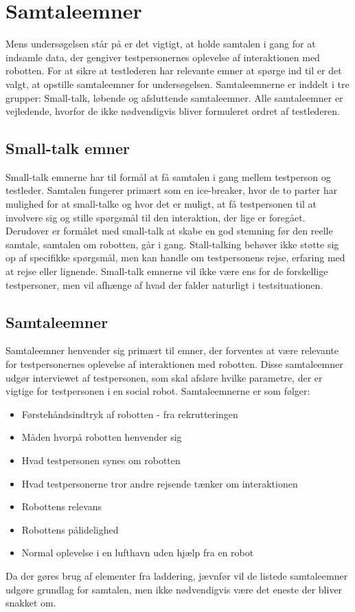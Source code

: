 \section{Samtaleemner}
\label{ParametreSamtaleemner}
%
Mens undersøgelsen står på er det vigtigt, at holde samtalen i gang for at indsamle data, der gengiver testpersonernes oplevelse af interaktionen med robotten. For at sikre at testlederen har relevante emner at spørge ind til er det valgt, at opstille samtaleemner for undersøgelsen. Samtaleemnerne er inddelt i tre grupper: Small-talk, løbende og afsluttende samtaleemner. Alle samtaleemner er vejledende, hvorfor de ikke nødvendigvis bliver formuleret ordret af testlederen.

\subsection{Small-talk emner} 
\label{ParametreISmallTalk}
%
Small-talk emnerne har til formål at få samtalen i gang mellem testperson og testleder. Samtalen fungerer primært som en ice-breaker, hvor de to parter har mulighed for at small-talke og hvor det er muligt, at få testpersonen til at involvere sig og stille spørgsmål til den interaktion, der lige er foregået. Derudover er formålet med small-talk at skabe en god stemning før den reelle samtale, samtalen om robotten, går i gang. Stall-talking behøver ikke støtte sig op af specifikke spørgsmål, men kan handle om testpersonens rejse, erfaring med at rejse eller lignende. Small-talk emnerne vil ikke være ens for de forskellige testpersoner, men vil afhænge af hvad der falder naturligt i testsituationen.  
%
\subsection{Samtaleemner} 
\label{ParametreSamtaleemner}
%
Samtaleemner henvender sig primært til emner, der forventes at være relevante for testpersonernes oplevelse af interaktionen med robotten. Disse samtaleemner udgør interviewet af testpersonen, som skal afsløre hvilke parametre, der er vigtige for testpersonen i en social robot. Samtaleemnerne er som følger:\blankline
%
\begin{itemize}
\item Førstehåndsindtryk af robotten - fra rekrutteringen
\item Måden hvorpå robotten henvender sig
\item Hvad testpersonen synes om robotten
\item Hvad testpersonerne tror andre rejsende tænker om interaktionen 
\item Robottens relevans
\item Robottens pålidelighed
\item Normal oplevelse i en lufthavn uden hjælp fra en robot 
\end{itemize}
%
Da der gøres brug af elementer fra laddering, jævnfør  vil de listede samtaleemner udgøre grundlag for samtalen, men ikke nødvendigvis være det eneste der bliver snakket om. 
%

